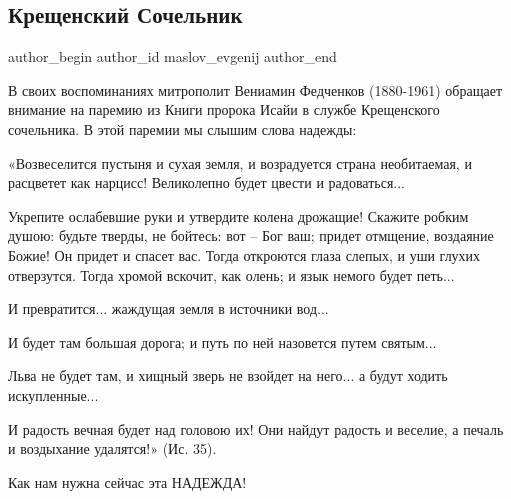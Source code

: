  
 
 
 
 
\subsection{Крещенский Сочельник}
\ifcmt
  author_begin
   author_id maslov_evgenij
  author_end
\fi

В своих воспоминаниях митрополит Вениамин Федченков (1880-1961) обращает
внимание на паремию из Книги пророка Исайи в службе Крещенского сочельника. В
этой паремии мы слышим слова надежды:

«Возвеселится пустыня и сухая земля, и возрадуется страна необитаемая, и
расцветет как нарцисс! Великолепно будет цвести и радоваться... 

Укрепите ослабевшие руки и утвердите колена дрожащие! Скажите робким душою:
будьте тверды, не бойтесь: вот – Бог ваш; придет отмщение, воздаяние Божие! Он
придет и спасет вас. Тогда откроются глаза слепых, и уши глухих отверзутся.
Тогда хромой вскочит, как олень; и язык немого будет петь... 

И превратится... жаждущая земля в источники вод... 

И будет там большая дорога; и путь по ней назовется путем святым... 

Льва не будет там, и хищный зверь не взойдет на него... а будут ходить
искупленные... 

И радость вечная будет над головою их! Они найдут радость и веселие, а печаль и
воздыхание удалятся!» (Ис. 35).

Как нам нужна сейчас эта НАДЕЖДА!
